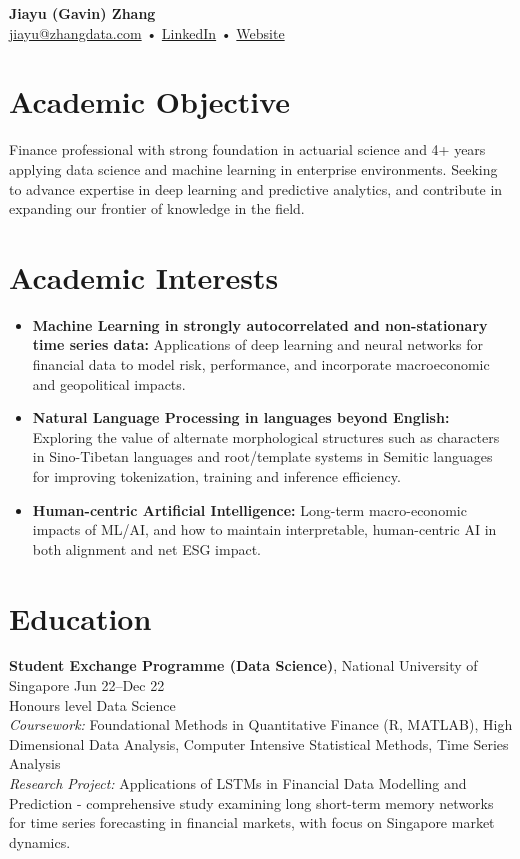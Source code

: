 \documentclass[10pt,letterpaper]{article}
\makeatletter
\newcommand{\name}{Jiayu (Gavin) Zhang}
\newcommand{\emailaddr}{jiayu@zhangdata.com}
\newcommand{\linkedin}{https://www.linkedin.com/in/jiayu-g-zhang}
\newcommand{\website}{https://www.zhangdata.com}
\makeatother
\begin{document}
\begin{center}
  {\LARGE\bfseries \name}\\[2pt]
  \href{mailto:\emailaddr}{\emailaddr} • \href{\linkedin}{LinkedIn} • \href{\website}{Website}
\end{center}

\section*{Academic Objective}
Finance professional with strong foundation in actuarial science and 4+ years applying data science and machine learning in enterprise environments. Seeking to advance expertise in deep learning and predictive analytics, and contribute in expanding our frontier of knowledge in the field.

\section*{Academic Interests}
\begin{itemize}
  \item \textbf{Machine Learning in strongly autocorrelated and non-stationary time series data:} Applications of deep learning and neural networks for financial data to model risk, performance, and incorporate macroeconomic and geopolitical impacts.
  \item \textbf{Natural Language Processing in languages beyond English:} Exploring the value of alternate morphological structures such as characters in Sino-Tibetan languages and root/template systems in Semitic languages for improving tokenization, training and inference efficiency.
  \item \textbf{Human-centric Artificial Intelligence:} Long-term macro-economic impacts of ML/AI, and how to maintain interpretable, human-centric AI in both alignment and net ESG impact.
\end{itemize}

\section*{Education}

\textbf{Student Exchange Programme (Data Science)}, National University of Singapore \hfill Jun 22--Dec 22\\
Honours level Data Science\\
\emph{Coursework:} Foundational Methods in Quantitative Finance (R, MATLAB), High Dimensional Data Analysis, Computer Intensive Statistical Methods, Time Series Analysis\\
\emph{Research Project:} Applications of LSTMs in Financial Data Modelling and Prediction - comprehensive study examining long short-term memory networks for time series forecasting in financial markets, with focus on Singapore market dynamics.
\end{document}
